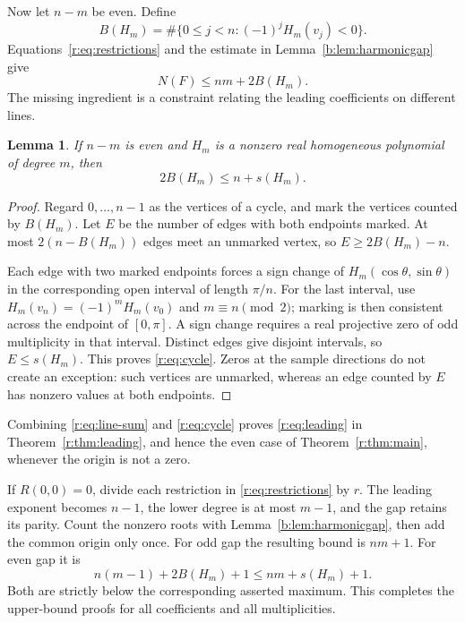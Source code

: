 \documentclass[UTF8,11pt]{ctexart}
\newtheorem{lem}[thm]{Lemma}
\theoremstyle{definition}
\numberwithin{equation}{section}
\begin{document}
Now let $n-m$ be even. Define
\[
 B(H_m)=\#\{0\le j<n:(-1)^jH_m(v_j)<0\}.
\]
Equations~\eqref{r:eq:restrictions} and the estimate in Lemma~\ref{b:lem:harmonicgap} give
\begin{equation}\label{r:eq:line-sum}
 N(F)\le nm+2B(H_m).
\end{equation}
The missing ingredient is a constraint relating the leading
coefficients on different lines.

\begin{lem}\label{r:lem:cycle}
If $n-m$ is even and $H_m$ is a nonzero real homogeneous polynomial
of degree $m$, then
\begin{equation}\label{r:eq:cycle}
 2B(H_m)\le n+s(H_m).
\end{equation}
\end{lem}
\begin{proof}
Regard $0,\ldots,n-1$ as the vertices of a cycle, and mark the vertices
counted by $B(H_m)$. Let $E$ be the number of edges with both endpoints
marked. At most $2(n-B(H_m))$ edges meet an unmarked vertex, so
$E\ge2B(H_m)-n$.

Each edge with two marked endpoints forces a sign change of
$H_m(\cos\theta,\sin\theta)$ in the corresponding open interval of
length $\pi/n$. For the last interval, use
$H_m(v_n)=(-1)^mH_m(v_0)$ and $m\equiv n\pmod2$; marking is then
consistent across the endpoint of $[0,\pi]$. A sign change requires a
real projective zero of odd multiplicity in that interval. Distinct
edges give disjoint intervals, so $E\le s(H_m)$. This proves
\eqref{r:eq:cycle}. Zeros at the sample directions do not create an
exception: such vertices are unmarked, whereas an edge counted by
$E$ has nonzero values at both endpoints.
\end{proof}

Combining \eqref{r:eq:line-sum} and \eqref{r:eq:cycle} proves
\eqref{r:eq:leading} in Theorem~\ref{r:thm:leading}, and hence the even case of
Theorem~\ref{r:thm:main}, whenever the origin is not a zero.

If $R(0,0)=0$, divide each restriction in \eqref{r:eq:restrictions} by
$r$. The leading exponent becomes $n-1$, the lower degree is at most
$m-1$, and the gap retains its parity. Count the nonzero roots with
Lemma~\ref{b:lem:harmonicgap}, then add the common origin only once.
For odd gap the resulting bound is $nm+1$. For even gap it is
\[
 n(m-1)+2B(H_m)+1\le nm+s(H_m)+1.
\]
Both are strictly below the corresponding asserted maximum. This
completes the upper-bound proofs for all coefficients and all
multiplicities.
\end{document}
